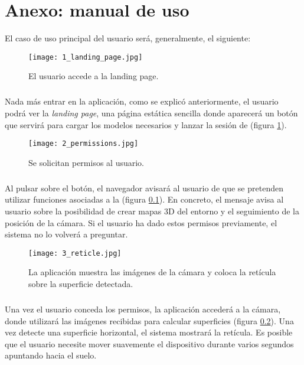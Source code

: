 \documentclass{subfiles}
\begin{document}
  \chapter*{Anexo: manual de uso}
  \label{sec:anexo_manual_de_uso}

        El caso de uso principal del usuario será, generalmente, el siguiente:

\begin{figure}[H]
\centering
\texttt{[image: 1\_landing\_page.jpg]}
\caption{El usuario accede a la landing page.}
\label{fig:1_landing_page}
\end{figure}

        \paragraph{}
        Nada más entrar en la aplicación, como se explicó anteriormente, el usuario podrá ver la \textit{landing page}, una página estática sencilla donde aparecerá un botón que servirá para cargar los modelos necesarios y lanzar la sesión de \ra (figura \ref{fig:1_landing_page}). 

\begin{figure}[H]
\centering
\texttt{[image: 2\_permissions.jpg]}
\caption{Se solicitan permisos al usuario.}
\label{fig:2_permissions}
\end{figure}

        \paragraph{}
        Al pulsar sobre el botón, el navegador avisará al usuario de que se pretenden utilizar funciones asociadas a la \ra (figura \ref{fig:2_permissions}). En concreto, el mensaje avisa al usuario sobre la posibilidad de crear mapas 3D del entorno y el seguimiento de la posición de la cámara. Si el usuario ha dado estos permisos previamente, el sistema no lo volverá a preguntar.

\begin{figure}[H]
\centering
\texttt{[image: 3\_reticle.jpg]}
\caption{La aplicación muestra las imágenes de la cámara y coloca la retícula sobre la superficie detectada.}
\label{fig:3_reticle}
\end{figure}

        \paragraph{}
        Una vez el usuario conceda los permisos, la aplicación accederá a la cámara, donde utilizará las imágenes recibidas para calcular superficies (figura \ref{fig:3_reticle}). Una vez detecte una superficie horizontal, el sistema mostrará la retícula. Es posible que el usuario necesite mover suavemente el dispositivo durante varios segundos apuntando hacia el suelo.
\end{document}
